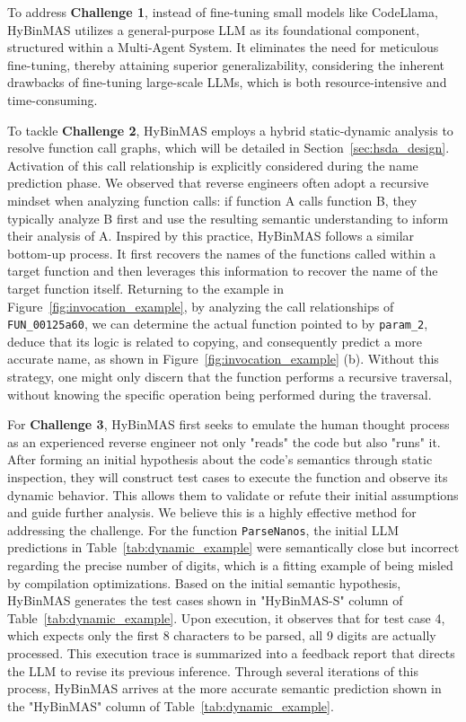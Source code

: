 \documentclass[acmsmall,screen,review,anonymous]{acmart} %
\begin{document}
To address \textbf{Challenge 1}, instead of fine-tuning small models like CodeLlama, HyBinMAS utilizes a general-purpose LLM as its foundational component, structured within a Multi-Agent System. It eliminates the need for meticulous fine-tuning, thereby attaining superior generalizability, considering the inherent drawbacks of fine-tuning large-scale LLMs, which is both resource-intensive and time-consuming\cite{LLaMA}.

To tackle \textbf{Challenge 2}, HyBinMAS employs a hybrid static-dynamic analysis to resolve function call graphs, which will be detailed in Section~\ref{sec:hsda_design}. Activation of this call relationship is explicitly considered during the name prediction phase. We observed that reverse engineers often adopt a recursive mindset when analyzing function calls: if function A calls function B, they typically analyze B first and use the resulting semantic understanding to inform their analysis of A. Inspired by this practice, HyBinMAS follows a similar bottom-up process. It first recovers the names of the functions called within a target function and then leverages this information to recover the name of the target function itself. Returning to the example in Figure~\ref{fig:invocation_example}, by analyzing the call relationships of \lstinline{FUN_00125a60}, we can determine the actual function pointed to by \lstinline{param_2}, deduce that its logic is related to copying, and consequently predict a more accurate name, as shown in Figure~\ref{fig:invocation_example} (b). Without this strategy, one might only discern that the function performs a recursive traversal, without knowing the specific operation being performed during the traversal.

For \textbf{Challenge 3}, HyBinMAS first seeks to emulate the human thought process as an experienced reverse engineer not only "reads" the code but also "runs" it. After forming an initial hypothesis about the code's semantics through static inspection, they will construct test cases to execute the function and observe its dynamic behavior. This allows them to validate or refute their initial assumptions and guide further analysis. We believe this is a highly effective method for addressing the challenge. For the function \lstinline{ParseNanos}, the initial LLM predictions in Table~\ref{tab:dynamic_example} were semantically close but incorrect regarding the precise number of digits, which is a fitting example of being misled by compilation optimizations. Based on the initial semantic hypothesis, HyBinMAS generates the test cases shown in "HyBinMAS-S" column of Table~\ref{tab:dynamic_example}. Upon execution, it observes that for test case 4, which expects only the first 8 characters to be parsed, all 9 digits are actually processed. This execution trace is summarized into a feedback report that directs the LLM to revise its previous inference. Through several iterations of this process, HyBinMAS arrives at the more accurate semantic prediction shown in the "HyBinMAS" column of Table~\ref{tab:dynamic_example}.
\end{document}
